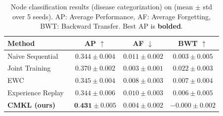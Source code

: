 \begin{table}[t]
\centering
\caption{Node classification results (disease categorization) on \ours (mean $\pm$ std over 5 seeds). AP: Average Performance, AF: Average Forgetting, BWT: Backward Transfer. Best AP is \textbf{bolded}.}
\label{tab:nc_results}
\small
\begin{tabular}{lccc}
\toprule
\textbf{Method} & \textbf{AP} $\uparrow$ & \textbf{AF} $\downarrow$ & \textbf{BWT} $\uparrow$ \\
\midrule
Naive Sequential & $0.344 \pm 0.004$ & $0.011 \pm 0.002$ & $0.003 \pm 0.005$ \\
Joint Training & $0.370 \pm 0.002$ & $0.003 \pm 0.001$ & $0.022 \pm 0.003$ \\
EWC~\citep{Kirkpatrick2017} & $0.345 \pm 0.004$ & $0.008 \pm 0.003$ & $0.007 \pm 0.004$ \\
Experience Replay~\citep{Rolnick2019} & $0.344 \pm 0.006$ & $0.010 \pm 0.003$ & $0.006 \pm 0.005$ \\
\midrule
\textbf{CMKL (ours)} & $\textbf{0.431} \pm 0.005$ & $0.004 \pm 0.002$ & $-0.000 \pm 0.002$ \\
\bottomrule
\end{tabular}
\end{table}

